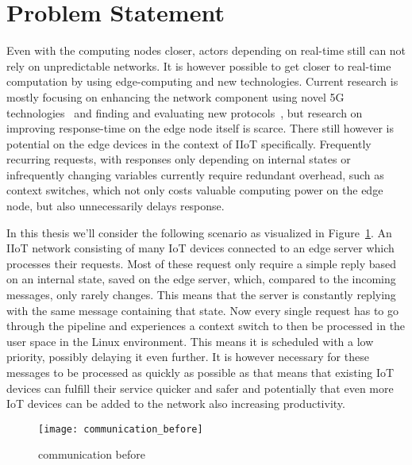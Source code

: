 \section{Problem Statement}

Even with the computing nodes closer, actors depending on real-time still can
not rely on unpredictable networks. It is however possible to get closer to
real-time computation by using edge-computing and new technologies. Current
research is mostly focusing on enhancing the network component using novel 5G
technologies~\cite{nunna_enabling_2015} and finding and evaluating new
protocols~\cite{suriyachai_survey_2012}, but research on improving response-time
on the edge node itself is scarce. There still however is potential on the edge
devices in the context of IIoT specifically. Frequently recurring requests, with
responses only depending on internal states or infrequently changing variables
currently require redundant overhead, such as context switches, which not only
costs valuable computing power on the edge node, but also unnecessarily delays
response.

In this thesis we'll consider the following scenario as visualized in
Figure~\ref{fig:communication_before}. An IIoT network consisting of many IoT
devices connected to an edge server which processes their requests. Most of
these request only require a simple reply based on an internal state, saved on
the edge server, which, compared to the incoming messages, only rarely changes.
This means that the server is constantly replying with the same message
containing that state. Now every single request has to go through the pipeline
and experiences a context switch to then be processed in the user space in the
Linux environment. This means it is scheduled with a low priority, possibly
delaying it even further. It is however necessary for these messages to be
processed as quickly as possible as that means that existing IoT devices can
fulfill their service quicker and safer and potentially that even more IoT
devices can be added to the network also increasing productivity.

\begin{figure}[htpb]
       \centering
       \texttt{[image: communication\_before]}
       \caption{communication before%
       \label{fig:communication_before}}%
\end{figure}
